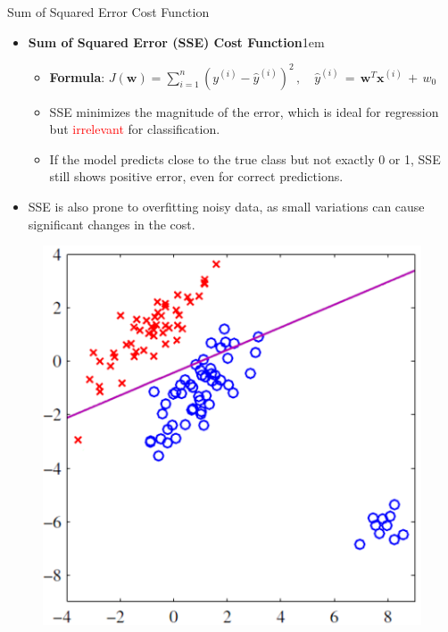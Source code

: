 \documentclass[serif, aspectratio=169]{beamer}
\begin{document}
\begin{frame}{Sum of Squared Error Cost Function}
    \begin{itemize}
        \item \textbf{Sum of Squared Error (SSE) Cost Function}\itemsep1em
        \medskip
        \begin{itemize}\itemsep0.8em
            \item \textbf{Formula}:
                \(
                J(\mathbf{w}) = \sum_{i=1}^{n} (y^{(i)} - \hat{y}^{(i)})^2 \, , \quad \hat{y}^{(i)} \, = \, \mathbf{w}^T\mathbf{x}^{(i)} \, + \, w_0
                \)
            \item \justifying SSE minimizes the magnitude of the error, which is ideal for regression but \textcolor{red}{irrelevant} for classification.
            \item \justifying If the model predicts close to the true class but not exactly 0 or 1, SSE still shows positive error, even for correct predictions.
        \end{itemize}
    \end{itemize}
    \begin{itemize}
        \item SSE is also prone to overfitting noisy data, as small variations can cause significant changes in the cost.
    \end{itemize}
    \endminipage
        \begin{figure}
            \centering
            \includegraphics[width=.62\linewidth]{pic/Figure_11.png}
        \end{figure}
    \endminipage
    \vfill
\end{frame}
\end{document}
